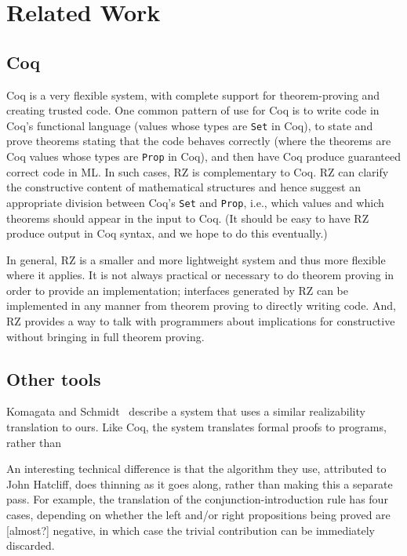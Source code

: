 \section{Related Work}
\label{sec:related-work}

\subsection{Coq}
\label{sec:comparison-with-coq}

Coq is a very flexible system, with complete support for
theorem-proving and creating trusted code. One common pattern of use
for Coq is to write code in Coq's functional language (values whose
types are \texttt{Set} in Coq), to state and prove theorems stating
that the code behaves correctly (where the theorems are Coq values
whose types are \texttt{Prop} in Coq), and then have Coq produce
guaranteed correct code in ML. In such cases, RZ is complementary to
Coq. RZ can clarify the constructive content of mathematical
structures and hence suggest an appropriate division between Coq's
\texttt{Set} and \texttt{Prop}, i.e., which values and which theorems
should appear in the input to Coq. (It should be easy to have RZ
produce output in Coq syntax, and we hope to do this eventually.)

In general, RZ is a smaller and more lightweight system and thus more
flexible where it applies. It is not always practical or necessary to
do theorem proving in order to provide an implementation; interfaces
generated by RZ can be implemented in any manner from theorem proving
to directly writing code. And, RZ provides a way to talk with
programmers about implications for constructive without bringing in
full theorem proving.


\subsection{Other tools}

Komagata and Schmidt~\cite{komagata+:tr95} describe a system that uses
a similar realizability translation to ours. Like Coq, the system
translates formal proofs to programs, rather than

An interesting technical difference is that the algorithm they use,
attributed to John Hatcliff, does thinning as it goes along, rather
than making this a separate pass. For example, the translation of the
conjunction-introduction rule has four cases, depending on whether the
left and/or right propositions being proved are [almost?] negative, in
which case the trivial contribution can be immediately discarded.

